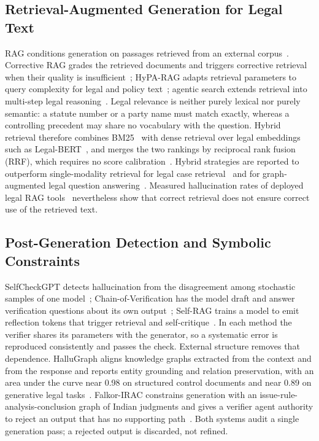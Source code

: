 \documentclass[conference]{IEEEtran}
\begin{document}
\subsection{Retrieval-Augmented Generation for Legal Text}
RAG conditions generation on passages retrieved from an external corpus~\cite{lewis2020}. Corrective RAG grades the retrieved documents and triggers corrective retrieval when their quality is insufficient~\cite{crag}; HyPA-RAG adapts retrieval parameters to query complexity for legal and policy text~\cite{hyparag}; agentic search extends retrieval into multi-step legal reasoning~\cite{lras}. Legal relevance is neither purely lexical nor purely semantic: a statute number or a party name must match exactly, whereas a controlling precedent may share no vocabulary with the question. Hybrid retrieval therefore combines BM25~\cite{bm25} with dense retrieval over legal embeddings such as Legal-BERT~\cite{legalbert}, and merges the two rankings by reciprocal rank fusion (RRF), which requires no score calibration~\cite{rrf}. Hybrid strategies are reported to outperform single-modality retrieval for legal case retrieval~\cite{sectionhybrid} and for graph-augmented legal question answering~\cite{leakgraphrag}. Measured hallucination rates of deployed legal RAG tools~\cite{magesh2025} nevertheless show that correct retrieval does not ensure correct use of the retrieved text.

\subsection{Post-Generation Detection and Symbolic Constraints}
SelfCheckGPT detects hallucination from the disagreement among stochastic samples of one model~\cite{selfcheckgpt}; Chain-of-Verification has the model draft and answer verification questions about its own output~\cite{cove}; Self-RAG trains a model to emit reflection tokens that trigger retrieval and self-critique~\cite{selfrag}. In each method the verifier shares its parameters with the generator, so a systematic error is reproduced consistently and passes the check. External structure removes that dependence. HalluGraph aligns knowledge graphs extracted from the context and from the response and reports entity grounding and relation preservation, with an area under the curve near 0.98 on structured control documents and near 0.89 on generative legal tasks~\cite{hallugraph}. Falkor-IRAC constrains generation with an issue-rule-analysis-conclusion graph of Indian judgments and gives a verifier agent authority to reject an output that has no supporting path~\cite{falkorirac}. Both systems audit a single generation pass; a rejected output is discarded, not refined.
\end{document}
